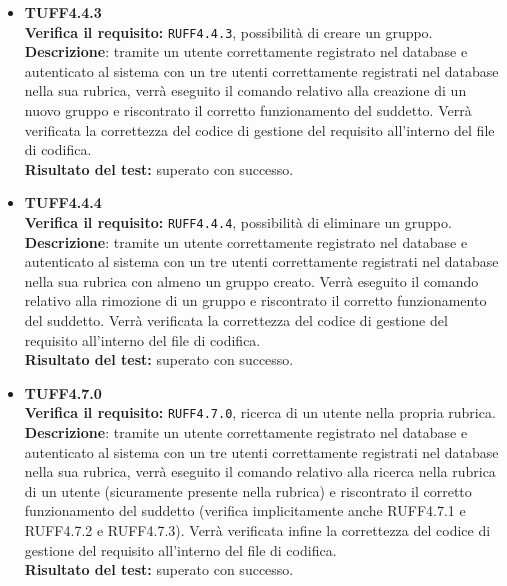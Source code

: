 \begin{itemize}
\item \textbf{TUFF4.4.3}\\
\textbf{Verifica il requisito:} \texttt{RUFF4.4.3}, possibilità di creare un gruppo.\\
\textbf{Descrizione}: tramite un utente  correttamente registrato nel database e autenticato al sistema con un tre utenti  correttamente registrati nel database nella sua rubrica, verrà eseguito il comando relativo alla creazione di un nuovo gruppo e riscontrato il corretto funzionamento del suddetto. Verrà verificata la correttezza del codice di gestione del requisito all'interno del file di codifica.\\
\textbf{Risultato del test:} superato con successo.

\item \textbf{TUFF4.4.4}\\
\textbf{Verifica il requisito:} \texttt{RUFF4.4.4}, possibilità di eliminare un gruppo.\\
\textbf{Descrizione}: tramite un utente  correttamente registrato nel database e autenticato al sistema con un tre utenti  correttamente registrati nel database nella sua rubrica con almeno un gruppo creato. Verrà eseguito il comando relativo alla rimozione di un gruppo e riscontrato il corretto funzionamento del suddetto. Verrà verificata la correttezza del codice di gestione del requisito all'interno del file di codifica.\\
\textbf{Risultato del test:} superato con successo.

\item \textbf{TUFF4.7.0}\\ 
\textbf{Verifica il requisito:} \texttt{RUFF4.7.0}, ricerca di un utente nella propria rubrica.\\
\textbf{Descrizione}: tramite un utente  correttamente registrato nel database e autenticato al sistema con un tre utenti  correttamente registrati nel database nella sua rubrica, verrà eseguito il comando relativo alla ricerca nella rubrica di un utente (sicuramente presente nella rubrica) e riscontrato il corretto funzionamento del suddetto (verifica implicitamente anche RUFF4.7.1 e RUFF4.7.2 e RUFF4.7.3). Verrà verificata infine la correttezza del codice di gestione del requisito all'interno del file di codifica.\\
\textbf{Risultato del test:} superato con successo.


\end{itemize}
